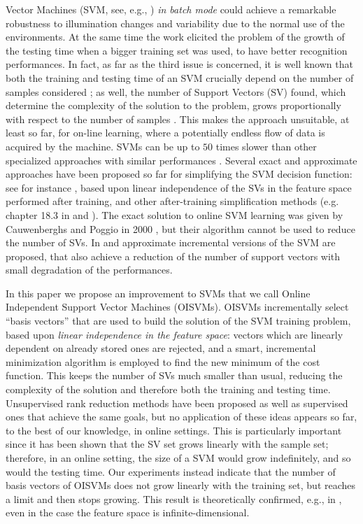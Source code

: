 Vector Machines (SVM, see, e.g., \cite{BGV92}) \emph{in batch mode}
could achieve a remarkable robustness to illumination changes and
variability due to the normal use of the environments. At the same time
the work elicited the problem of the growth of the testing time when a bigger
training set was used, to have better recognition performances.
In fact, as far as the third issue is concerned, it is well known that
both the training and testing time of an SVM crucially depend on the number of samples
considered \cite{KeerthiCDC06}; as well, the number of Support Vectors
(SV) found, which determine the complexity of the solution to the
problem, grows proportionally with respect to the number of samples
\cite{Steinwart03}. This makes the approach unsuitable, at least so
far, for on-line learning, where a potentially endless flow of data is
acquired by the machine. SVMs can be up to $50$ times slower than
other specialized approaches with similar performances
\cite{BurgesS96}.
Several exact and approximate approaches have been proposed so
far for simplifying the SVM decision function: see for instance
\cite{DownsGM01}, based upon linear independence of the SVs in the
feature space performed after training, and other after-training simplification methods (e.g. 
chapter 18.3 in \cite{SmolaS02} and \cite{nguyen2005}).
The exact
solution to online SVM learning was given by Cauwenberghs and Poggio
in 2000 \cite{CauwenberghsP00}, but their algorithm cannot be used to
reduce the number of SVs. In \cite{syed99incremental} and
\cite{pronobis:icvs06} approximate incremental
versions of the SVM are proposed, that also achieve a reduction of the
number of support vectors with small degradation of the performances.

In this paper we propose an improvement to SVMs that we call Online
Independent Support Vector Machines (OISVMs). OISVMs incrementally
select ``basis vectors'' that are used to build the solution of the
SVM training problem, based upon \emph{linear independence in the
feature space}: vectors which are linearly dependent on already stored
ones are rejected, and a smart, incremental minimization algorithm is
employed to find the new minimum of the cost function. This keeps the
number of SVs much smaller than usual, reducing the complexity of the
solution and therefore both the training and testing time. 
Unsupervised rank reduction methods have been proposed
\cite{Baudat03} as well as supervised ones \cite{BachJordan2005}
that achieve the same goals, but
no application of these ideas appears so far, to the best of our
knowledge, in online settings.
This is particularly important since it
has been shown \cite{Steinwart03} that the SV set grows linearly with
the sample set; therefore, in an online setting, the size of a SVM
would grow indefinitely, and so would the testing time. 
Our experiments instead indicate that the number of basis
vectors of OISVMs does not grow linearly with the training set, but
reaches a limit and then stops growing. This result is theoretically
confirmed, e.g., in \cite{engel2004}, even in the case the feature
space is infinite-dimensional.


